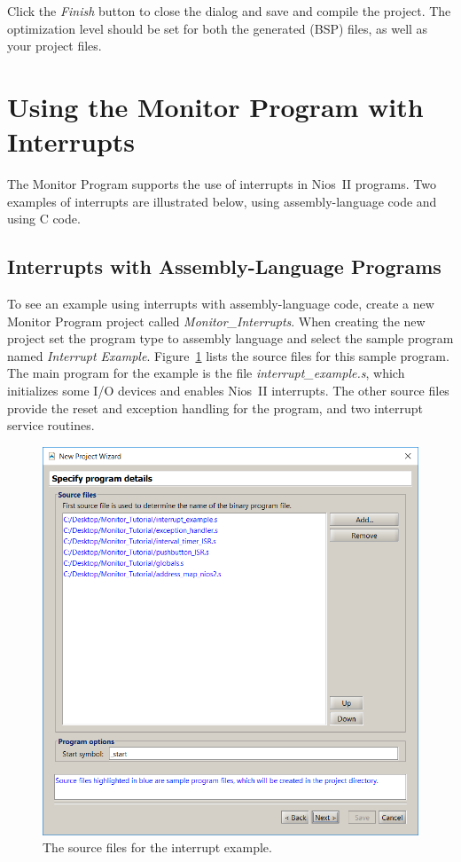 \documentclass[11pt, twoside, pdftex]{article}
\begin{document}
Click the {\it Finish} button to close the dialog and save and compile the project. The optimization level should be set for both the generated (BSP) files, as well as your project files.



\section{Using the Monitor Program with Interrupts}

The Monitor Program supports the use of interrupts in Nios~II
programs. Two examples of interrupts are illustrated below, 
using assembly-language code and using C code.

\subsection{Interrupts with Assembly-Language Programs}

To see an example using interrupts with assembly-language code, 
create a new Monitor Program project
called {\it Monitor\_Interrupts}. When creating the new project
set the program type to assembly language and select the sample
program named {\it Interrupt Example}. 
Figure~\ref{fig:31} lists the source files for this sample program. 
The main program for the example is the file 
{\it interrupt\_example.s}, which initializes some I/O devices
and enables Nios~II interrupts. The other source files provide
the reset and exception handling for the program, and two interrupt service routines.

\begin{figure}[H]
   \begin{center}
      \includegraphics[scale=0.5]{screenshots/figure31.png}
   \end{center}
   \caption{The source files for the interrupt example.} 
	 \label{fig:31}
\end{figure}
\end{document}
